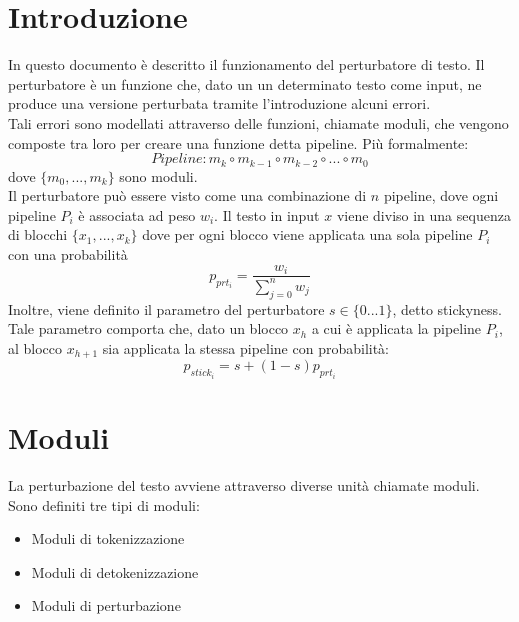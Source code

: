 \documentclass[12pt]{article}
\begin{document}
\maketitle


\section{Introduzione}
In questo documento è descritto il funzionamento del perturbatore di testo. Il perturbatore è un funzione che, dato un un determinato testo come input, ne produce una versione perturbata tramite l'introduzione alcuni errori. \\
Tali errori sono modellati attraverso delle funzioni, chiamate moduli, che vengono composte tra loro per creare una funzione detta pipeline.
Più formalmente:
\begin{equation}
\textit{Pipeline}: m_k \circ m_{k-1} \circ m_{k-2} \circ ... \circ m_0
\end{equation}
dove $\{m_0,...,m_k \}$ sono moduli.\\
Il perturbatore può essere visto come una combinazione di $n$ pipeline, dove ogni pipeline $P_i$ è associata ad peso $w_i$. Il testo in input $x$ viene diviso in una sequenza di blocchi $\{ x_1,...,x_k \}$ dove per ogni blocco viene applicata una sola pipeline $P_i$ con una probabilità
\begin{equation}
p_{prt_i} =
\frac{w_i}
{{\sum_{j=0}^{n}}w_j}
\end{equation}
Inoltre, viene definito il parametro del perturbatore $s \in \{0...1\}$, detto stickyness. Tale parametro comporta che, dato un blocco $x_h$ a cui è applicata la pipeline $P_i$, al blocco $x_{h+1}$ sia applicata la stessa pipeline con probabilità:
\begin{equation}
p_{stick_i} =
s + (1-s)  p_{prt_i}
\end{equation}


\section{Moduli}
La perturbazione del testo avviene attraverso diverse unità chiamate moduli. Sono definiti tre tipi di moduli:
\begin{itemize}
	\item Moduli di tokenizzazione
	\item Moduli di detokenizzazione
	\item Moduli di perturbazione
\end{itemize}
\end{document}
